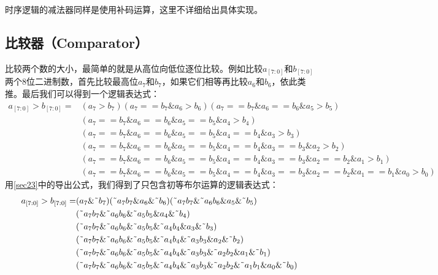 时序逻辑的减法器同样是使用补码运算，这里不详细给出具体实现。

\subsection{比较器（Comparator）}
比较两个数的大小，最简单的就是从高位向低位逐位比较。例如比较$a_{[7:0]}$和$b_{[7:0]}$两个8位二进制数，首先比较最高位$a_7$和$b_7$，如果它们相等再比较$a_6$和$b_6$，依此类推。最后我们可以得到一个逻辑表达式：
\[\begin{split}
a_{[7:0]}\mathtt{>}b_{[7:0]}=&(a_7\mathtt{>}b_7)(a_7\mathtt{==}b_7\& a_6\mathtt{>}b_6)(a_7\mathtt{==}b_7\& a_6\mathtt{==}b_6\& a_5\mathtt{>}b_5)\\
&(a_7\mathtt{==}b_7\& a_6\mathtt{==}b_6\& a_5\mathtt{==}b_5\& a_4\mathtt{>}b_4)\\
&(a_7\mathtt{==}b_7\& a_6\mathtt{==}b_6\& a_5\mathtt{==}b_5\& a_4\mathtt{==}b_4\& a_3\mathtt{>}b_3)\\
&(a_7\mathtt{==}b_7\& a_6\mathtt{==}b_6\& a_5\mathtt{==}b_5\& a_4\mathtt{==}b_4\& a_3\mathtt{==}b_3\& a_2\mathtt{>}b_2)\\
&(a_7\mathtt{==}b_7\& a_6\mathtt{==}b_6\& a_5\mathtt{==}b_5\& a_4\mathtt{==}b_4\& a_3\mathtt{==}b_3\& a_2\mathtt{==}b_2\& a_1\mathtt{>}b_1)\\
&(a_7\mathtt{==}b_7\& a_6\mathtt{==}b_6\& a_5\mathtt{==}b_5\& a_4\mathtt{==}b_4\& a_3\mathtt{==}b_3\& a_2\mathtt{==}b_2\& a_1\mathtt{==}b_1\& a_0\mathtt{>}b_0)
\end{split}\]
用\autoref{sec23}中的导出公式，我们得到了只包含初等布尔运算的逻辑表达式：
\[\begin{split}
a_{[7:0]}>b_{[7:0]}=&(a_7\&\textrm{\~{}}b_7)(\textrm{\~{}}a_7b_7\& a_6\&\textrm{\~{}}b_6)(\textrm{\~{}}a_7b_7\&\textrm{\~{}}a_6b_6\& a_5\&\textrm{\~{}}b_5)\\
					&(\textrm{\~{}}a_7b_7\&\textrm{\~{}}a_6b_6\&\textrm{\~{}}a_5b_5\& a_4\&\textrm{\~{}}b_4)\\
					&(\textrm{\~{}}a_7b_7\&\textrm{\~{}}a_6b_6\&\textrm{\~{}}a_5b_5\&\textrm{\~{}}a_4b_4\& a_3\&\textrm{\~{}}b_3)\\
					&(\textrm{\~{}}a_7b_7\&\textrm{\~{}}a_6b_6\&\textrm{\~{}}a_5b_5\&\textrm{\~{}}a_4b_4\&\textrm{\~{}}a_3b_3\& a_2\&\textrm{\~{}}b_2)\\
					&(\textrm{\~{}}a_7b_7\&\textrm{\~{}}a_6b_6\&\textrm{\~{}}a_5b_5\&\textrm{\~{}}a_4b_4\&\textrm{\~{}}a_3b_3\&\textrm{\~{}}a_2b_2\& a_1\&\textrm{\~{}}b_1)\\
					&(\textrm{\~{}}a_7b_7\&\textrm{\~{}}a_6b_6\&\textrm{\~{}}a_5b_5\&\textrm{\~{}}a_4b_4\&\textrm{\~{}}a_3b_3\&\textrm{\~{}}a_2b_2\&\textrm{\~{}}a_1b_1\& a_0\&\textrm{\~{}}b_0)
\end{split}\]

